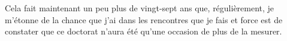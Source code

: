 

%
%
%
%
%
%
%

Cela fait maintenant un peu plus de vingt-sept ans que, régulièrement, 
je m'étonne de la chance que j'ai dans les rencontres que je fais et
force est de constater que ce doctorat n'aura été qu'une occasion de plus de la mesurer.


